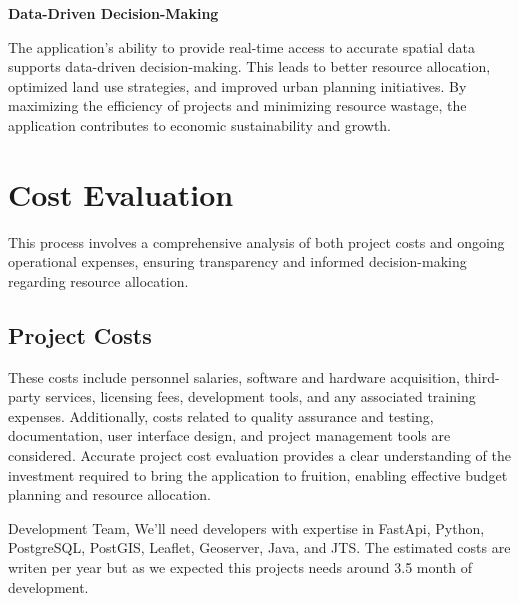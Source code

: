 \textbf{Data-Driven Decision-Making}

The application's ability to provide real-time access to accurate spatial data supports data-driven decision-making.
This leads to better resource allocation, optimized land use strategies, and improved urban planning initiatives.
By maximizing the efficiency of projects and minimizing resource wastage, the application contributes to economic sustainability and growth.


\section{Cost Evaluation}\label{sec:cost-evaluation}
This process involves a comprehensive analysis of both project costs and ongoing operational expenses, ensuring transparency and informed decision-making regarding resource allocation.
\subsection{Project Costs}\label{subsec:project-costs}
These costs include personnel salaries, software and hardware acquisition, third-party services, licensing fees, development tools, and any associated training expenses.
Additionally, costs related to quality assurance and testing, documentation, user interface design, and project management tools are considered.
Accurate project cost evaluation provides a clear understanding of the investment required to bring the application to fruition, enabling effective budget planning and resource allocation.

Development Team, We'll need developers with expertise in FastApi, Python, PostgreSQL, PostGIS, Leaflet, Geoserver, Java, and JTS.
The estimated costs are writen per year but as we expected this projects needs around 3.5 month of development.


